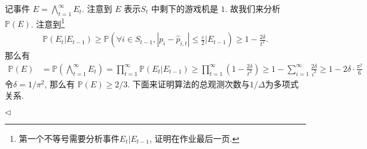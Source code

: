 \documentclass[11pt]{article}
\newenvironment{answer}[1][Solution]{\begin{trivlist}
    \item[\hskip \labelsep {\bfseries #1.}\hskip \labelsep]}{\hfill$\lhd$\end{trivlist}}
\newcommand\1{\mathds{1}}
\newcommand\PP{\mathbb{P}}
\begin{document}
\begin{answer}
\begin{enumerate}[label=(\arabic*)]
        记事件 $E = \bigwedge_{t=1}^{\infty} E_t$. 注意到 $E$ 表示$S_t$ 中剩下的游戏机是 $1$. 故我们来分析 $\PP(E)$. 注意到\footnote{第一个不等号需要分析事件$E_t|E_{t-1}$, 证明在作业最后一页. }
        \begin{align}
            \label{eq:2}
            \PP(E_t|E_{t-1}) \ge \PP\left(\forall i\in S_{t-1}, |p_i - \hat{p}_{i,t}| \le \frac{\varepsilon}{2} \bigg| E_{t-1}\right) \ge 1 - \frac{2\delta}{t^2}.
        \end{align}
        那么有
        \begin{align*}
            \PP(E) &= \PP\left(\bigwedge_{t=1}^{\infty} E_t\right) = \prod_{t=1}^{\infty} \PP(E_t|E_{t-1}) \ge \prod_{t=1}^{\infty} \left(1 - \frac{2\delta}{t^2}\right) \ge 1 - \sum_{i=1}^{\infty} \frac{2\delta}{i^2} \ge 1 - 2\delta\cdot \frac{\pi^2}{6} 
        \end{align*}
        令$\delta = 1/\pi^2$, 那么有 $\PP(E) \ge 2/3$. 下面来证明算法的总观测次数与$1/\Delta$为多项式关系. 
        

\end{enumerate}
\end{answer}
\end{document}

